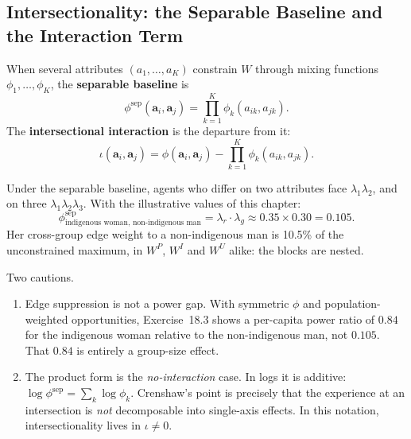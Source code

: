 \documentclass[../structural_economics_book.tex]{subfiles}
\begin{document}
\subsection{Intersectionality: the Separable Baseline and the Interaction Term}
\label{ch18:sec:intersection}

\begin{definition}\label{ch18:thm:intersectionality}
When several attributes $(a_1, \ldots, a_K)$ constrain $W$ through mixing functions $\phi_1, \ldots, \phi_K$, the \textbf{separable baseline} is
\begin{equation}\label{ch18:eq:intersectional}
\phi^{\text{sep}}(\mathbf{a}_i, \mathbf{a}_j) = \prod_{k=1}^K \phi_k(a_{ik}, a_{jk}).
\end{equation}
The \textbf{intersectional interaction} is the departure from it:
\begin{equation}\label{ch18:eq:interaction}
\iota(\mathbf{a}_i, \mathbf{a}_j) = \phi(\mathbf{a}_i, \mathbf{a}_j) - \prod_{k=1}^K \phi_k(a_{ik}, a_{jk}).
\end{equation}
\end{definition}

Under the separable baseline, agents who differ on two attributes face $\lambda_1 \lambda_2$, and on three $\lambda_1 \lambda_2 \lambda_3$. With the illustrative values of this chapter:
\begin{equation}\label{ch18:eq:bolivia_intersection}
\phi^{\text{sep}}_{\text{indigenous woman, non-indigenous man}} = \lambda_r \cdot \lambda_g \approx 0.35 \times 0.30 = 0.105.
\end{equation}
Her cross-group edge weight to a non-indigenous man is 10.5\% of the unconstrained maximum, in $W^P$, $W^I$ and $W^U$ alike: the blocks are nested.

Two cautions.
\begin{enumerate}
\item Edge suppression is not a power gap. With symmetric $\phi$ and population-weighted opportunities, Exercise~18.3 shows a per-capita power ratio of $0.84$ for the indigenous woman relative to the non-indigenous man, not $0.105$. That $0.84$ is entirely a group-size effect.
\item The product form is the \emph{no-interaction} case. In logs it is additive: $\log\phi^{\text{sep}} = \sum_k \log\phi_k$. Crenshaw's point is precisely that the experience at an intersection is \emph{not} decomposable into single-axis effects. In this notation, intersectionality lives in $\iota \neq 0$.
\end{enumerate}
\end{document}
